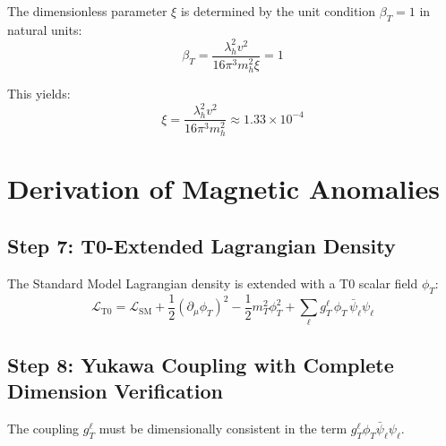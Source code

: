 \documentclass[12pt,a4paper]{article}
\begin{document}
	The dimensionless parameter $\xi$ is determined by the unit condition $\beta_T = 1$ in natural units:
	\begin{equation}
		\beta_T = \frac{\lambda_h^2 v^2}{16\pi^3 m_h^2 \xi} = 1
	\end{equation}
	
	This yields:
	\begin{equation}
		\xi = \frac{\lambda_h^2 v^2}{16\pi^3 m_h^2} \approx 1.33 \times 10^{-4}
		\label{eq:xi_value}
	\end{equation}
	
	\section{Derivation of Magnetic Anomalies}
	
	\subsection{Step 7: T0-Extended Lagrangian Density}
	
	The Standard Model Lagrangian density is extended with a T0 scalar field $\phi_T$:
	\begin{equation}
		\mathcal{L}_{\text{T0}} = \mathcal{L}_{\text{SM}} + \frac{1}{2}(\partial_\mu \phi_T)^2 - \frac{1}{2} m_T^2 \phi_T^2 + \sum_\ell g_T^\ell \, \phi_T \, \bar{\psi}_\ell \psi_\ell
		\label{eq:lagrangian}
	\end{equation}
	
	\subsection{Step 8: Yukawa Coupling with Complete Dimension Verification}
	
	The coupling $g_T^\ell$ must be dimensionally consistent in the term $g_T^\ell \phi_T \bar{\psi}_\ell \psi_\ell$.
	
\end{document}
